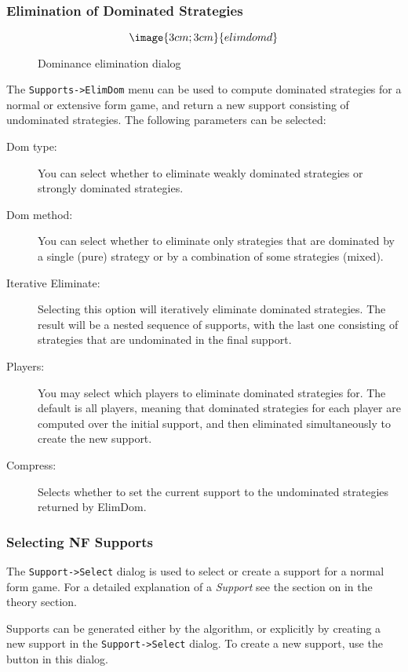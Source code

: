 {\subsubsection{Elimination of Dominated Strategies}\label{ElimDom}
\begin{figure}
$$\image{3cm;3cm}{elimdomd}$$
\caption{Dominance elimination dialog}\label{fig_elimdomd}
\end{figure}

The {\tt Supports->ElimDom} menu can be used to compute dominated 
strategies for a normal or extensive form game, and return a new support 
consisting of undominated strategies.  
The following parameters can 
be selected:
\begin{description}
\item[Dom type:]  You can select whether to eliminate weakly dominated 
strategies or strongly dominated strategies.
\item[Dom method:] You can select whether to eliminate only strategies that are
dominated by a single (pure) strategy or by a combination of some strategies
(mixed).
\item[Iterative Eliminate:] Selecting this option will iteratively eliminate dominated strategies. The 
result will be a nested sequence of supports, with the last one consisting of 
strategies that are undominated in the final support.  
\item[Players:] You may select which players to eliminate dominated strategies for. The 
default is all players, meaning that dominated strategies for each player are computed 
over the initial support, and then eliminated simultaneously to create the new support.  
\item[Compress:] Selects whether to set the current support to the undominated 
strategies returned by ElimDom.  
\end{description}

\subsubsection{Selecting NF Supports}\label{ElimDomInspect}

The {\tt Support->Select} dialog is used to select or create a support for 
a normal form game.  For a detailed explanation of a {\em Support} see 
the section on  in the theory section.

Supports can be generated either by the 
 algorithm, 
or explicitly by creating a new support in the {\tt Support->Select} dialog.  
To create a new support, use the  button in this 
dialog.  

}
